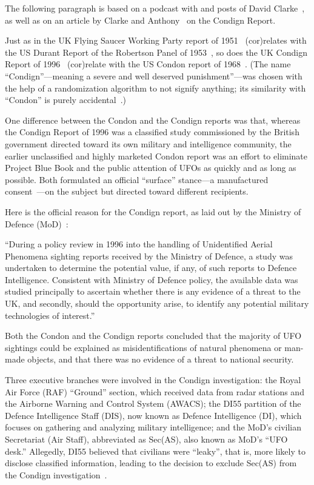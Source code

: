 The following paragraph is based on a podcast with and posts of David Clarke~\cite{Clarke2022Nov,BibEntry2018May},
as well as on an article by Clarke and Anthony~\cite{Clarke-Anthony-IUR-Condign} on the Condign Report.

Just as in the UK Flying Saucer Working Party report of 1951~\cite{FSWP1951}
(cor)relates with the US Durant Report of the Robertson Panel of 1953~\cite{RobertsonPanelDurantReport},
so does the UK Condign Report of 1996~\cite{CondignReport}
(cor)relate with the US Condon report of 1968~\cite{Condon-report,Condon-report-Bantam,Condon-report-Dutton,BibEntry2023Jan}.
(The name ``Condign''---meaning a severe and well deserved punishment''---was chosen with the help of a randomization algorithm to not signify anything;
its similarity with ``Condon'' is purely accidental~\cite{Clarke2022Nov}.)

One difference between the Condon and the Condign reports was that, whereas
the Condign Report of 1996 was a classified study commissioned by the British government directed toward its own military and intelligence community,
the earlier unclassified and highly marketed Condon report was an effort to eliminate Project Blue Book and the public attention of UFOs as quickly and as long as possible.
Both formulated an official ``surface'' stance---a manufactured consent~\cite{Herman2002Jan}---on the subject but directed toward different recipients.

Here is the official reason for the Condign report, as laid out by the Ministry of Defence (MoD)~\cite{CondignReport}:
\begin{svgraybox}
``During a policy review in 1996 into the handling of Unidentified Aerial Phenomena sighting reports received by the Ministry of Defence,
 a study was undertaken to determine the potential value, if any, of such reports to Defence Intelligence.
Consistent with Ministry of Defence policy, the available data was studied principally to ascertain whether
there is any evidence of a threat to the UK, and secondly, should the opportunity arise, to identify any potential military technologies of interest.''
\end{svgraybox}
Both the Condon and the Condign  reports concluded that the majority of UFO sightings could be explained as misidentifications of natural phenomena or man-made objects,
and that there was no evidence of a threat to national security.

Three executive branches were involved in the Condign investigation: the Royal Air Force (RAF) ``Ground'' section, which received data from radar stations and the Airborne Warning and Control System (AWACS); the DI55 partition of the Defence Intelligence Staff (DIS), now known as Defence Intelligence (DI), which focuses on gathering and analyzing military intelligence; and the MoD's civilian Secretariat (Air Staff), abbreviated as Sec(AS), also known as MoD's ``UFO desk.'' Allegedly, DI55 believed that civilians were ``leaky'',
that is, more likely to disclose classified information, leading to the decision to exclude Sec(AS) from the Condign investigation~\cite{BibEntry2018May}.

